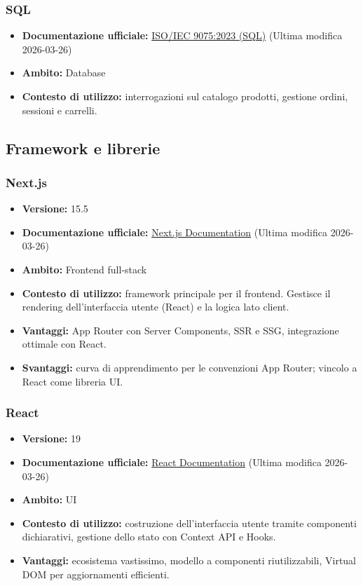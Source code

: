\documentclass[a4paper, 11pt, oneside]{scrartcl}
\begin{document}
\subsubsection{SQL}
\begin{itemize}[noitemsep]
\item \textbf{Documentazione ufficiale:} \href{https://www.iso.org/standard/76584.html}{ISO/IEC 9075:2023 (SQL)} (Ultima modifica 2026-03-26)
\item \textbf{Ambito:} Database
\item \textbf{Contesto di utilizzo:} interrogazioni sul catalogo prodotti, gestione ordini, sessioni e carrelli.
\end{itemize}

\subsection{Framework e librerie}

\subsubsection{Next.js}
\begin{itemize}[noitemsep]
\item \textbf{Versione:} 15.5
\item \textbf{Documentazione ufficiale:} \href{https://nextjs.org/docs}{Next.js Documentation} (Ultima modifica 2026-03-26)
\item \textbf{Ambito:} Frontend full-stack
\item \textbf{Contesto di utilizzo:} framework principale per il frontend. Gestisce il rendering dell'interfaccia utente (React) e la logica lato client.
\item \textbf{Vantaggi:} App Router con Server Components, SSR e SSG, integrazione ottimale con React.
\item \textbf{Svantaggi:} curva di apprendimento per le convenzioni App Router; vincolo a React come libreria UI.
\end{itemize}

\subsubsection{React}
\begin{itemize}[noitemsep]
\item \textbf{Versione:} 19
\item \textbf{Documentazione ufficiale:} \href{https://react.dev/learn}{React Documentation} (Ultima modifica 2026-03-26)
\item \textbf{Ambito:} UI
\item \textbf{Contesto di utilizzo:} costruzione dell'interfaccia utente tramite componenti dichiarativi, gestione dello stato con Context API e Hooks.
\item \textbf{Vantaggi:} ecosistema vastissimo, modello a componenti riutilizzabili, Virtual DOM per aggiornamenti efficienti.
\end{itemize}
\end{document}
